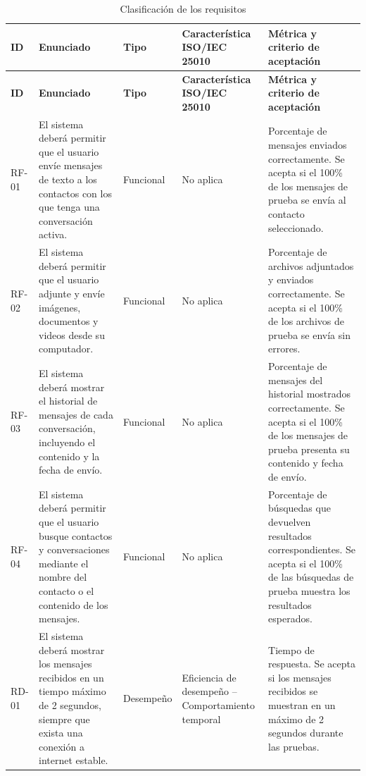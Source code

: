 \documentclass[12pt,a4paper,oneside]{article}
\begin{document}
\small
\begin{longtable}{C{1.1cm} L{4.0cm} L{2.0cm} L{3.0cm} L{4.0cm}}

\caption{Clasificación de los requisitos}\label{tab:clasificacion}\\

\toprule
\textbf{ID} &
\textbf{Enunciado} &
\textbf{Tipo} &
\textbf{Característica ISO/IEC 25010} &
\textbf{Métrica y criterio de aceptación} \\

\midrule
\endfirsthead

\toprule
\textbf{ID} &
\textbf{Enunciado} &
\textbf{Tipo} &
\textbf{Característica ISO/IEC 25010} &
\textbf{Métrica y criterio de aceptación} \\

\midrule
\endhead

\bottomrule
\endfoot

RF-01 &
El sistema deberá permitir que el usuario envíe mensajes de texto a los contactos con los que tenga una conversación activa. &
Funcional &
No aplica &
Porcentaje de mensajes enviados correctamente. Se acepta si el 100\% de los mensajes de prueba se envía al contacto seleccionado. \\

RF-02 &
El sistema deberá permitir que el usuario adjunte y envíe imágenes, documentos y videos desde su computador. &
Funcional &
No aplica &
Porcentaje de archivos adjuntados y enviados correctamente. Se acepta si el 100\% de los archivos de prueba se envía sin errores. \\

RF-03 &
El sistema deberá mostrar el historial de mensajes de cada conversación, incluyendo el contenido y la fecha de envío. &
Funcional &
No aplica &
Porcentaje de mensajes del historial mostrados correctamente. Se acepta si el 100\% de los mensajes de prueba presenta su contenido y fecha de envío. \\

RF-04 &
El sistema deberá permitir que el usuario busque contactos y conversaciones mediante el nombre del contacto o el contenido de los mensajes. &
Funcional &
No aplica &
Porcentaje de búsquedas que devuelven resultados correspondientes. Se acepta si el 100\% de las búsquedas de prueba muestra los resultados esperados. \\

RD-01 &
El sistema deberá mostrar los mensajes recibidos en un tiempo máximo de 2 segundos, siempre que exista una conexión a internet estable. &
Desempeño &
Eficiencia de desempeño -- Comportamiento temporal &
Tiempo de respuesta. Se acepta si los mensajes recibidos se muestran en un máximo de 2 segundos durante las pruebas. \\


\end{longtable}
\end{document}
